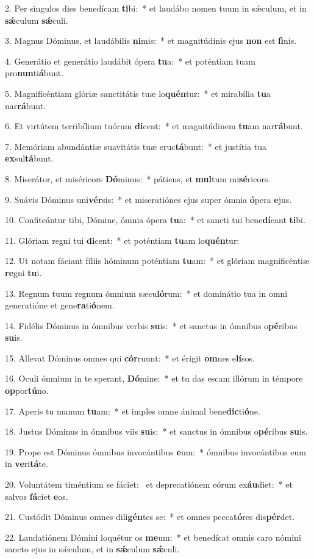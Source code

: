 2. Per síngulos dies benedícam \textbf{ti}bi:~*  et laudábo nomen tuum in sǽculum, et in \textbf{sǽ}culum \textbf{sǽ}culi.\

3. Magnus Dóminus, et laudábilis \textbf{ni}mis:~*  et magnitúdinis ejus \textbf{non} est \textbf{fi}nis.\

4. Generátio et generátio laudábit ópera \textbf{tu}a:~*  et poténtiam tuam pro\textbf{nun}ti\textbf{á}bunt.\

5. Magnificéntiam glóriæ sanctitátis tuæ lo\textbf{quén}tur:~*  et mirabília \textbf{tu}a nar\textbf{rá}bunt.\

6. Et virtútem terribílium tuórum \textbf{di}cent:~*  et magnitúdinem \textbf{tu}am nar\textbf{rá}bunt.\

7. Memóriam abundántiæ suavitátis tuæ eruc\textbf{tá}bunt:~*  et justítia tua \textbf{ex}sul\textbf{tá}bunt.\

8. Miserátor, et miséricors \textbf{Dó}minus:~*  pátiens, et \textbf{mul}tum mi\textbf{sé}ricors.\

9. Suávis Dóminus uni\textbf{vér}sis:~*  et miseratiónes ejus super ómnia \textbf{ó}pera \textbf{e}jus.\

10. Confiteántur tibi, Dómine, ómnia ópera \textbf{tu}a:~*  et sancti tui bene\textbf{dí}cant \textbf{ti}bi.\

11. Glóriam regni tui \textbf{di}cent:~*  et poténtiam \textbf{tu}am lo\textbf{quén}tur:\

12. Ut notam fáciant fíliis hóminum poténtiam \textbf{tu}am:~*  et glóriam magnificéntiæ \textbf{re}gni \textbf{tu}i.\

13. Regnum tuum regnum ómnium sæcu\textbf{ló}rum:~*  et dominátio tua in omni generatióne et gene\textbf{ra}ti\textbf{ó}nem.\

14. Fidélis Dóminus in ómnibus verbis \textbf{su}is:~*  et sanctus in ómnibus o\textbf{pé}ribus \textbf{su}is.\

15. Allevat Dóminus omnes qui \textbf{cór}ruunt:~*  et érigit \textbf{om}nes e\textbf{lí}sos.\

16. Oculi ómnium in te sperant, \textbf{Dó}mine:~*  et tu das escam illórum in témpore \textbf{op}por\textbf{tú}no.\

17. Aperis tu manum \textbf{tu}am:~*  et imples omne ánimal bene\textbf{dic}ti\textbf{ó}ne.\

18. Justus Dóminus in ómnibus viis \textbf{su}is:~*  et sanctus in ómnibus o\textbf{pé}ribus \textbf{su}is.\

19. Prope est Dóminus ómnibus invocántibus \textbf{e}um:~*  ómnibus invocántibus eum in \textbf{ve}ri\textbf{tá}te.\

20. Voluntátem timéntium se fáciet: \dag\  et deprecatiónem eórum ex\textbf{áu}diet:~*  et salvos \textbf{fá}ciet \textbf{e}os.\

21. Custódit Dóminus omnes dili\textbf{gén}tes se:~*  et omnes pecca\textbf{tó}res dis\textbf{pér}det.\

22. Laudatiónem Dómini loquétur os \textbf{me}um:~*  et benedícat omnis caro nómini sancto ejus in sǽculum, et in \textbf{sǽ}culum \textbf{sǽ}culi.\

